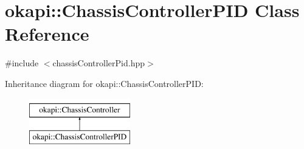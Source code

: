 \hypertarget{classokapi_1_1ChassisControllerPID}{}\section{okapi\+::Chassis\+Controller\+P\+ID Class Reference}
\label{classokapi_1_1ChassisControllerPID}


{\ttfamily \#include $<$chassis\+Controller\+Pid.\+hpp$>$}

Inheritance diagram for okapi\+::Chassis\+Controller\+P\+ID\+:\begin{figure}[H]
\begin{center}
\leavevmode
\includegraphics[height=2.000000cm]{classokapi_1_1ChassisControllerPID}
\end{center}
\end{figure}
